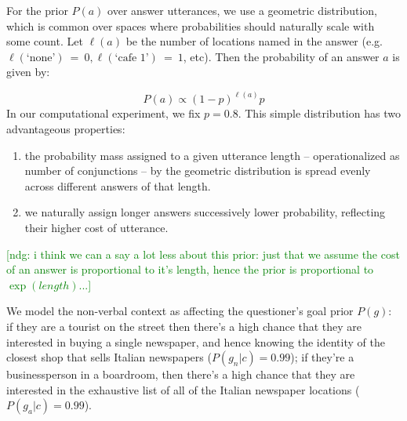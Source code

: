 \documentclass[12pt, floatsintext, jou]{apa6}
\newcommand{\ndg}[1]{\textcolor{Green}{[ndg: #1]}}
\begin{document}
For the prior $P(a)$ over answer utterances, we use a geometric distribution, which is common over spaces where probabilities should naturally scale with some count. Let $\ell(a)$ be the number of locations named in the answer (e.g. $\ell(\textrm{`none'})~=~0, \ell(\textrm{`cafe 1'})~=~1$, etc). Then the probability of an answer $a$ is given by:

$$P(a) \propto (1 - p)^{\ell(a)}p$$
In our computational experiment, we fix $p = 0.8$. 
This simple distribution has two advantageous properties: 
\begin{enumerate}[(1)]
\item the probability mass assigned to a given utterance length -- operationalized as number of conjunctions -- by the geometric distribution is spread evenly across different answers of that length.
\item we naturally assign longer answers successively lower probability, reflecting their higher cost of utterance. \end{enumerate}

\ndg{i think we can a say a lot less about this prior: just that we assume the cost of an answer is proportional to it's length, hence the prior is proportional to $\exp(length)$...}


We model the non-verbal context as affecting the questioner's goal prior $P(g)$: if they are a tourist on the street then there's a high chance that they are interested in buying a single newspaper, and hence knowing the identity of the closest shop that sells Italian newspapers ($P(g_n | c) = 0.99$); if they're a businessperson in a boardroom, then there's a high chance that they are interested in the exhaustive list of all of the Italian newspaper locations ($P(g_a | c) = 0.99$).

\end{document}
